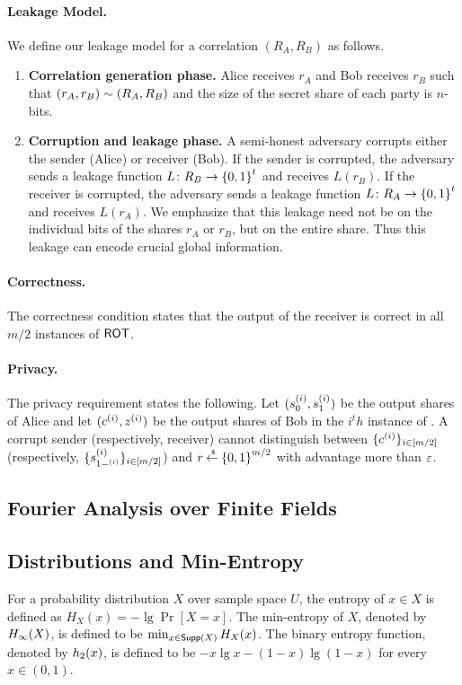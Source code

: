 \paragraph{Leakage Model.} We define our leakage model for a correlation $(R_A,R_B)$ as follows.
\begin{enumerate}
	\item {\bfseries Correlation generation phase.} Alice receives $r_A$ and Bob receives $r_B$ such that $(r_A, r_B) \sim (R_A,R_B)$ and the size of the secret share of each party is $n$-bits.
	
	\item {\bfseries Corruption and leakage phase.} A semi-honest adversary corrupts either the sender (Alice) or receiver (Bob).
	If the sender is corrupted, the adversary sends a leakage function $L \colon R_B \rightarrow {\{0,1\}}^t$ and receives $L(r_B)$.
	If the receiver is corrupted, the adversary sends a leakage function $L\colon R_A \rightarrow {\{0,1\}}^t$ and receives $L(r_A)$.
	We emphasize that this leakage need not be on the individual bits of the shares $r_A$ or $r_B$, but on the entire share.
	Thus this leakage can encode crucial global information.
\end{enumerate}

\paragraph{Correctness.} The correctness condition states that the output of the receiver is correct in all $m/2$ instances of $\ROT$.

\paragraph{Privacy.} The privacy requirement states the following.
Let $(s_0^{{\left(i\right)}}, s_1^{{\left(i\right)}})$ be the output shares of Alice and let $(c^{{\left(i\right)}}, z^{{\left(i\right)}})$ be the output shares of Bob in the $i^th$ instance of \ROT.
A corrupt sender (respectively, receiver) cannot distinguish between $\{ c^{{\left(i\right)}} \}_{i \in [m/2]}$ (respectively, $\{ s_{1-^{{\left(i\right)}}}^{{\left(i\right)}}  \}_{i \in [m/2]}$) and $r \mathbin{\stackrel{\mbox{\,\tiny \$}}{\gets}} {\{0,1\}}^{m/2}$ with advantage more than $\varepsilon$.

\subsection{Fourier Analysis over Finite Fields}\label{sec:prelim-fourier}

\subsection{Distributions and Min-Entropy}\label{sec:prelim-min-ent}
For a probability distribution $X$ over sample space $U$, the entropy of $x \in X$ is defined as $H_X(x) = -\lg\Pr[X = x]$.
The min-entropy of $X$, denoted by $H_\infty(X)$, is defined to be $\min_{x \in \mathsf{Supp}(X)} H_X(x)$.
The binary entropy function, denoted by $h_2(x)$, is defined to be $-x \lg x - (1-x) \lg(1-x)$ for every $x \in (0,1)$.

